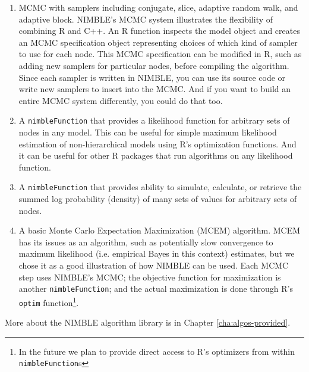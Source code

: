 \documentclass[12pt,oneside]{book}\usepackage[]{graphicx}\usepackage[]{color}
\def\cd#1{\texttt{#1}}
\begin{document}
\begin{enumerate}
\item MCMC with samplers including conjugate, slice, adaptive random
  walk, and adaptive block.  NIMBLE's MCMC system illustrates the
  flexibility of combining R and C++.  An R function inspects the
  model object and creates an MCMC specification object representing
  choices of which kind of sampler to use for each node.  This MCMC
  specification can be modified in R, such as adding new samplers for
  particular nodes, before compiling the algorithm.  Since
  each sampler is written in NIMBLE, you can use its source code or
  write new samplers to insert into the MCMC.  And if you want to
  build an entire MCMC system differently, you could do that too.
\item A \cd{nimbleFunction} that provides a likelihood function for
  arbitrary sets of nodes in any model. This can be useful for simple
  maximum likelihood estimation of non-hierarchical models using R's
  optimization functions.  And it can be useful for other R packages
  that run algorithms on any likelihood function.
\item A \cd{nimbleFunction} that provides ability to simulate,
  calculate, or retrieve the summed log probability (density) of many
 sets of values for
  arbitrary sets of nodes.
\item A basic Monte Carlo Expectation Maximization (MCEM) algorithm.
  MCEM has its issues as an algorithm, such as potentially slow convergence to maximum
  likelihood (i.e. empirical Bayes in this context) estimates, but we chose it as a
  good illustration of how NIMBLE can be used.  Each MCMC step uses
  NIMBLE's MCMC; the objective function for maximization is another
  \cd{nimbleFunction}; and the actual maximization is done through R's
  \cd{optim} function\footnote{In the future we plan to provide direct
    access to R's optimizers from within \cd{nimbleFunction}s}.
\end{enumerate}
  
More about the NIMBLE algorithm library is in Chapter \ref{cha:algos-provided}.
\end{document}
